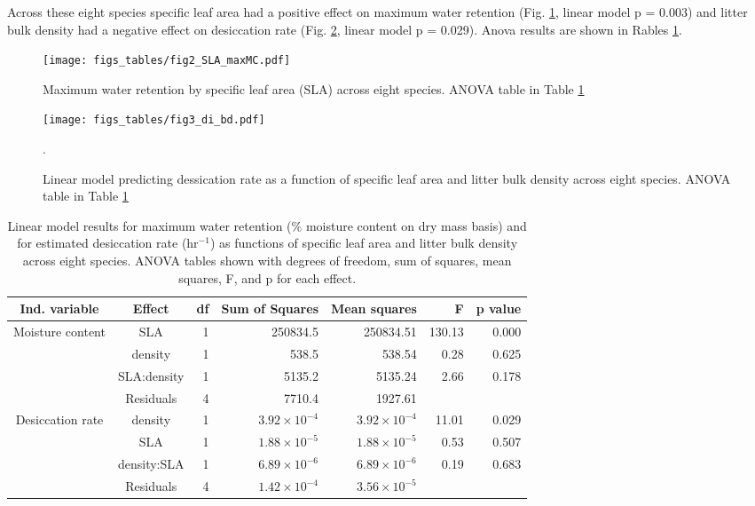 \documentclass[fire,article,submit,moreauthors,pdftex]{Definitions/mdpi}
\begin{document}
Across these eight species specific leaf area had a positive effect on maximum
water retention (Fig. \ref{fig:maxmc-di}, linear model p = 0.003) and litter
bulk density had a negative effect on desiccation rate (Fig. \ref{fig:bd-di},
linear model p = 0.029). Anova results are shown in Rables \ref{tab:mc_di_anova}.

\begin{figure}[H]
  \centering
\texttt{[image: figs\_tables/fig2\_SLA\_maxMC.pdf]}
\caption{Maximum water retention by specific leaf area (SLA) across eight species. ANOVA table in Table \ref{tab:mc_di_anova}}
  \label{fig:maxmc-di}
\end{figure}


\begin{figure}[H]
  \centering
\texttt{[image: figs\_tables/fig3\_di\_bd.pdf]}
\caption{Linear model predicting dessication rate as a function of specific leaf area and litter bulk density across eight species. ANOVA table in Table \ref{tab:mc_di_anova}}.
  \label{fig:bd-di}
\end{figure}



\begin{table}[H]
  \caption{Linear model results for maximum water retention (\% moisture content on dry mass basis) and for estimated desiccation rate (hr$^{-1}$) as functions of specific leaf area and litter bulk density across eight species. ANOVA tables shown with degrees of freedom, sum of squares, mean squares, F, and p for each effect.}
  \label{tab:mc_di_anova}
\centering

\begin{tabular}{ccrrrrr}
  \toprule
Ind. variable & Effect & df & Sum of Squares & Mean squares & F & p value \\ 
  \midrule
Moisture content & SLA & 1 & 250834.5 & 250834.51 & 130.13 & 0.000 \\ 
  & density & 1 & 538.5 & 538.54 & 0.28 & 0.625 \\ 
  & SLA:density & 1 & 5135.2 & 5135.24 & 2.66 & 0.178 \\ 
  & Residuals & 4 & 7710.4 & 1927.61 &  &  \\ 
  \midrule
  
Desiccation rate & density & 1 & $3.92 \times 10^{-4}$ & $3.92 \times 10^{-4}$ & 11.01 & 0.029 \\ 
 &  SLA & 1 & $1.88 \times 10^{-5}$ & $1.88 \times 10^{-5}$ & 0.53 & 0.507 \\ 
 &  density:SLA & 1 & $6.89 \times 10^{-6}$ & $6.89 \times 10^{-6}$ & 0.19 & 0.683 \\ 
 &  Residuals & 4 & $1.42 \times 10^{-4}$ & $3.56 \times 10^{-5}$ &  &  \\ 
   \bottomrule

\end{tabular}
\end{table}
\end{document}
